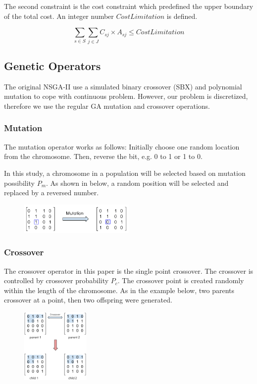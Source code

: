 \documentclass{llncs}
\begin{document}
The second constraint is the cost constraint which predefined the upper boundary of the total cost.
An integer number $CostLimitation$ is defined.
\begin{center}
	\begin{equation}
		\sum\limits_{s \in S} \sum\limits_{j \in J} C_{sj} \times A_{sj} \leq CostLimitation
	\end{equation}
\end{center}


\subsection{Genetic Operators}
\label{sec:operators}
 The original NSGA-II use a simulated 
binary crossover (SBX) \cite{930314} and polynomial mutation \cite{Raghuwanshi04} to cope with continuous problem. 
However, our problem is discretized, therefore we use the regular GA mutation and crossover operations.


\subsubsection{Mutation}
The mutation operator works as follows: Initially choose one random location from the chromosome. 
Then, reverse the bit, e.g. 0 to 1 or 1 to 0. 

In this study, a chromosome in a population will be selected based on mutation possibility $P_{m}$. 
As shown in below, a random position will be selected and replaced by a reversed number.
\begin{figure}[ht]
\centering
	\includegraphics[width=0.5\textwidth]{pics/mutation.png}
\caption{}
\label{graph1}
\end{figure}
\subsubsection{Crossover}
The crossover operator in this paper is the single point crossover. 
The crossover is controlled by crossover probability $P_{c}$. 
The crossover point is created randomly within the length of the chromosome. 
As in the example below, two parents crossover at a point, then two offspring were generated.
\begin{figure}[ht]
\centering
	\includegraphics[width=0.3\textwidth]{pics/crossover.png}
\caption{}
\label{graph2}
\end{figure}
\end{document}
